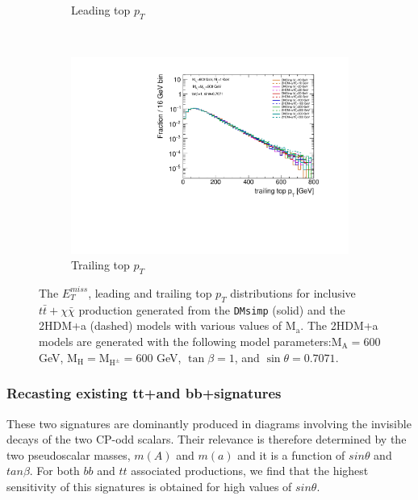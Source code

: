 \begin{figure}
\begin{subfigure}[b]{0.49\textwidth}
    \caption{Leading top $p_{T}$}
  \end{subfigure} \\
  \begin{subfigure}[b]{0.49\textwidth}
    \includegraphics[width=\textwidth]{texinputs/04_grid/figures/DMHF/benchmarking/MDM_1_MA_600_sinp_0.7071_tanb_1.0_DMsimpV2HDMa/top2ptlog.pdf}
    \caption{Trailing top $p_{T}$}
  \end{subfigure}
  \caption{The $E_{T}^{miss}$, leading and trailing top $p_{T}$ distributions for inclusive $t\bar{t}+\chi\bar{\chi}$ production generated from the \texttt{DMsimp} (solid) and the 2HDM+a (dashed) models with various values of $\mathrm{M_a}$. The 2HDM+a models are generated with the following model parameters:$\mathrm{M_A}=600$ GeV, $\mathrm{M_H}=\mathrm{M_{H^{\pm}}}=600$ GeV, $\tan\beta=1$, and $\sin\theta=0.7071$.}
\label{fig:DMSimpV2HDMa}
\end{figure}
\subsubsection{Recasting existing tt+\met and bb+\met signatures}
\label{subsub:hfttrecast}
These two signatures are dominantly produced in diagrams involving the invisible decays of the two CP-odd scalars. 
Their relevance is therefore determined by the two pseudoscalar masses, $m(A)$ and $m(a)$ and it is a function of 
$sin\theta$ and $tan\beta$. 
For both $bb$ and $tt$ associated productions, we find that the
highest sensitivity of this signatures is obtained for high values of $sin\theta$.


